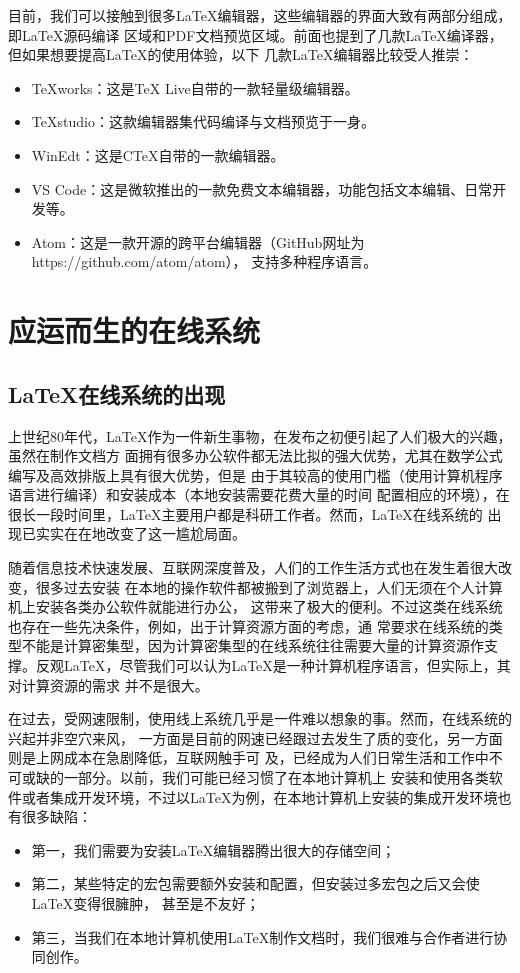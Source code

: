 目前，我们可以接触到很多LaTeX编辑器，这些编辑器的界面大致有两部分组成，即LaTeX源码编译
区域和PDF文档预览区域。前面也提到了几款LaTeX编译器，但如果想要提高LaTeX的使用体验，以下
几款LaTeX编辑器比较受人推崇：
\begin{itemize}
    \item TeXworks：这是TeX Live自带的一款轻量级编辑器。
    \item TeXstudio：这款编辑器集代码编译与文档预览于一身。
    \item WinEdt：这是CTeX自带的一款编辑器。
    \item VS Code：这是微软推出的一款免费文本编辑器，功能包括文本编辑、日常开发等。
    \item Atom：这是一款开源的跨平台编辑器（GitHub网址为https://github.com/atom/atom），
          支持多种程序语言。
\end{itemize}

\section{应运而生的在线系统}
\subsection{\LaTeX 在线系统的出现}
上世纪80年代，LaTeX作为一件新生事物，在发布之初便引起了人们极大的兴趣，虽然在制作文档方
面拥有很多办公软件都无法比拟的强大优势，尤其在数学公式编写及高效排版上具有很大优势，但是
由于其较高的使用门槛（使用计算机程序语言进行编译）和安装成本（本地安装需要花费大量的时间
配置相应的环境），在很长一段时间里，LaTeX主要用户都是科研工作者。然而，LaTeX在线系统的
出现已实实在在地改变了这一尴尬局面。

随着信息技术快速发展、互联网深度普及，人们的工作生活方式也在发生着很大改变，很多过去安装
在本地的操作软件都被搬到了浏览器上，人们无须在个人计算机上安装各类办公软件就能进行办公，
这带来了极大的便利。不过这类在线系统也存在一些先决条件，例如，出于计算资源方面的考虑，通
常要求在线系统的类型不能是计算密集型，因为计算密集型的在线系统往往需要大量的计算资源作支
撑。反观LaTeX，尽管我们可以认为LaTeX是一种计算机程序语言，但实际上，其对计算资源的需求
并不是很大。

在过去，受网速限制，使用线上系统几乎是一件难以想象的事。然而，在线系统的兴起并非空穴来风，
一方面是目前的网速已经跟过去发生了质的变化，另一方面则是上网成本在急剧降低，互联网触手可
及，已经成为人们日常生活和工作中不可或缺的一部分。以前，我们可能已经习惯了在本地计算机上
安装和使用各类软件或者集成开发环境，不过以LaTeX为例，在本地计算机上安装的集成开发环境也
有很多缺陷：
\begin{itemize}
    \item 第一，我们需要为安装LaTeX编辑器腾出很大的存储空间；
    \item 第二，某些特定的宏包需要额外安装和配置，但安装过多宏包之后又会使LaTeX变得很臃肿，
          甚至是不友好；
    \item 第三，当我们在本地计算机使用LaTeX制作文档时，我们很难与合作者进行协同创作。
\end{itemize}

